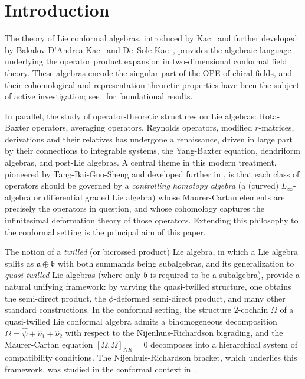 \documentclass[a4paper,11pt]{article}
\def\Vs{\mathfrak{a}}
\def\Ws{\mathfrak{b}}
\def\str{\Omega}
\def\smu{\widehat{\nu}_1}
\def\smv{\widehat{\nu}_2}
\def\shf{\widehat{\psi}}
\numberwithin{equation}{section}
\begin{document}
\section{Introduction}\label{sec:intro}

The theory of Lie conformal algebras, introduced by Kac~\cite{KAC} and
further developed by Bakalov-D'Andrea-Kac~\cite{BDK} and De~Sole-Kac~\cite{DK,DK3},
provides the algebraic language underlying the operator product expansion in
two-dimensional conformal field theory. These algebras encode the singular
part of the OPE of chiral fields, and their cohomological and
representation-theoretic properties have been the subject of active
investigation; see~\cite{BKV,DK3,DK13} for foundational results.

In parallel, the study of operator-theoretic structures on Lie
algebras:  Rota-Baxter operators, averaging operators, Reynolds
operators, modified $r$-matrices, derivations and their relatives has undergone
a renaissance, driven in large part by their connections to integrable
systems, the Yang-Baxter equation, dendriform algebras, and post-Lie
algebras. A central theme in this modern treatment, pioneered by
Tang-Bai-Guo-Sheng \cite{TBGS,TBGS2} and developed further
in \cite{Das0,Das1,JSZ,LST,TFS}, is that each class of operators should
be governed by a \emph{controlling homotopy algebra} (a (curved)
$L_\infty$-algebra or differential graded Lie algebra)  whose
Maurer-Cartan elements are precisely the operators in question, and
whose cohomology captures the infinitesimal deformation theory of those
operators. Extending this philosophy to the conformal setting is the
principal aim of this paper.

The notion of a \emph{twilled} (or bicrossed product) Lie algebra, in
which a Lie algebra splits as $\Vs\oplus\Ws$ with both summands being
subalgebras, and its generalization to \emph{quasi-twilled} Lie algebras
(where only $\Ws$ is required to be a subalgebra), provide a natural
unifying framework: by varying the quasi-twilled structure, one obtains
the semi-direct product, the $\phi$-deformed semi-direct product, and
many other standard constructions. In the conformal setting, the
structure $2$-cochain $\str$ of a quasi-twilled Lie conformal  algebra
admits a bihomogeneous decomposition
$\str = \shf + \smu + \smv$
with respect to the Nijenhuis-Richardson bigrading, and the
Maurer-Cartan equation $[\str,\str]_{NR}=0$ decomposes into a
hierarchical system of compatibility conditions. The
Nijenhuis-Richardson bracket, which underlies this framework, was
studied in the conformal context in~\cite{DK13}.
\end{document}
